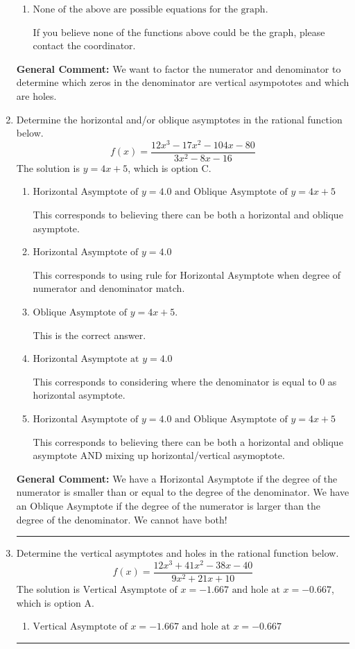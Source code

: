 \documentclass{extbook}[14pt]
\newcommand{\litem}[1]{\item #1

\rule{\textwidth}{0.4pt}}
\begin{document}
\begin{enumerate}
{\begin{enumerate}[label=\Alph*.]
Remember that factors are written as $x-z$. For example, the zero $x=-3$ corresponds to the factor $x-(-3)$.
\item \( \text{None of the above are possible equations for the graph.} \)

If you believe none of the functions above could be the graph, please contact the coordinator.
\end{enumerate}

\textbf{General Comment:} We want to factor the numerator and denominator to determine which zeros in the denominator are vertical asympototes and which are holes.
}
\litem{
Determine the horizontal and/or oblique asymptotes in the rational function below.
\[ f(x) = \frac{12x^{3} -17 x^{2} -104 x -80}{3x^{2} -8 x -16} \]The solution is \( y = 4x + 5 \), which is option C.\begin{enumerate}[label=\Alph*.]
\item \( \text{Horizontal Asymptote of } y = 4.0 \text{ and Oblique Asymptote of } y = 4x + 5 \)

This corresponds to believing there can be both a horizontal and oblique asymptote.
\item \( \text{Horizontal Asymptote of } y = 4.0  \)

This corresponds to using rule for Horizontal Asymptote when degree of numerator and denominator match.
\item \( \text{Oblique Asymptote of } y = 4x + 5. \)

This is the correct answer.
\item \( \text{Horizontal Asymptote at } y = 4.0 \)

This corresponds to considering where the denominator is equal to 0 as horizontal asymptote.
\item \( \text{Horizontal Asymptote of } y = 4.0 \text{ and Oblique Asymptote of } y = 4x + 5 \)

This corresponds to believing there can be both a horizontal and oblique asymptote AND mixing up horizontal/vertical asymoptote.
\end{enumerate}

\textbf{General Comment:} We have a Horizontal Asymptote if the degree of the numerator is smaller than or equal to the degree of the denominator. We have an Oblique Asymptote if the degree of the numerator is larger than the degree of the denominator. We cannot have both!
}
\litem{
Determine the vertical asymptotes and holes in the rational function below.
\[ f(x) = \frac{12x^{3} +41 x^{2} -38 x -40}{9x^{2} +21 x + 10} \]The solution is \( \text{Vertical Asymptote of } x = -1.667 \text{ and hole at } x = -0.667 \), which is option A.\begin{enumerate}[label=\Alph*.]
\item \( \text{Vertical Asymptote of } x = -1.667 \text{ and hole at } x = -0.667 \)


\end{enumerate}}
\end{enumerate}
\end{document}
